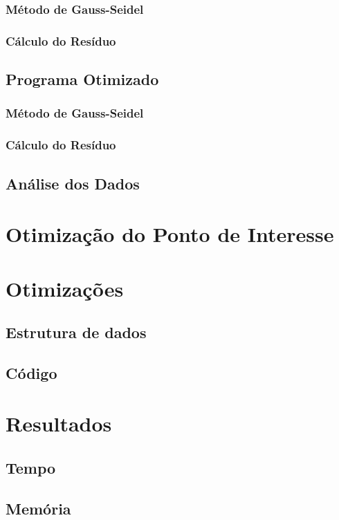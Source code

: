 \documentclass[12pt]{article}
\begin{document}
		\subsubsection{Método de Gauss-Seidel}
		\subsubsection{Cálculo do Resíduo}
	
	\subsection{Programa Otimizado}
		\subsubsection{Método de Gauss-Seidel}
		\subsubsection{Cálculo do Resíduo}

	\subsection{Análise dos Dados}

\newpage

\section{Otimização do Ponto de Interesse}

\newpage

\section{Otimizações}

\subsection{Estrutura de dados}

\subsection{Código}

\newpage

\section{Resultados}

\subsection{Tempo}

\subsection{Memória}

\newpage
\end{document}
